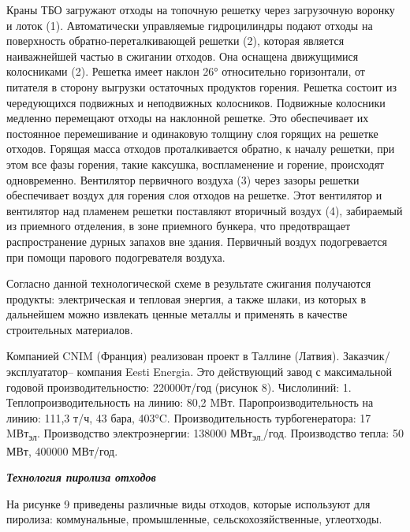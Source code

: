 \begin{multicols}{2}
Краны ТБО загружают отходы на топочную решетку через загрузочную воронку
и лоток (1). Автоматически управляемые гидроцилиндры подают отходы на
поверхность обратно-переталкивающей решетки (2), которая является
наиважнейшей частью в сжигании отходов. Она оснащена движущимися
колосниками (2). Решетка имеет наклон 26° относительно горизонтали, от
питателя в сторону выгрузки остаточных продуктов горения. Решетка
состоит из чередующихся подвижных и неподвижных колосников. Подвижные
колосники медленно перемещают отходы на наклонной решетке. Это
обеспечивает их постоянное перемешивание и одинаковую толщину слоя
горящих на решетке отходов. Горящая масса отходов проталкивается
обратно, к началу решетки, при этом все фазы горения, такие каксушка,
воспламенение и горение, происходят одновременно. Вентилятор первичного
воздуха (3) через зазоры решетки обеспечивает воздух для горения слоя
отходов на решетке. Этот вентилятор и вентилятор над пламенем решетки
поставляют вторичный воздух (4), забираемый из приемного отделения, в
зоне приемного бункера, что предотвращает распространение дурных запахов
вне здания. Первичный воздух подогревается при помощи парового
подогревателя воздуха.

Согласно данной технологической схеме в результате сжигания получаются
продукты: электрическая и тепловая энергия, а также шлаки, из которых в
дальнейшем можно извлекать ценные металлы и применять в качестве
строительных материалов.

Компанией CNIM (Франция) реализован проект в Таллине (Латвия).
Заказчик/эксплуататор-- компания Eesti Energia. Это действующий завод с
максимальной годовой производительностю: 220000т/год (рисунок 8).
Числолиний: 1. Теплопроизводительность на линию: 80,2 MВт.
Паропроизводительность на линию: 111,3 т/ч, 43 бара, 403°C.
Производительность турбогенератора: 17 MВт\textsubscript{эл}.
Производство электроэнергии: 138000 МВт\textsubscript{эл.}/год.
Производство тепла: 50 МВт, 400000 МВт/год.

\emph{{\bfseries Технология пиролиза отходов}}

На рисунке 9 приведены различные виды отходов, которые используют для
пиролиза: коммунальные, промышленные, сельскохозяйственные, углеотходы.
\end{multicols}

